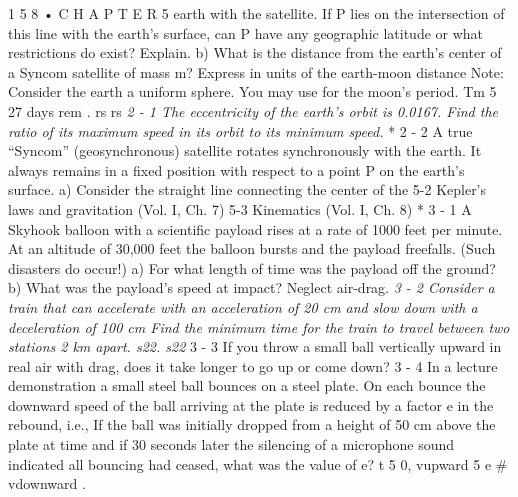 \documentclass[10pt,oneside]{article}
\begin{document}
1 5 8 • C H A P T E R  5 earth with the satellite. If P lies on the intersection of this line with the earth’s surface, can P have any geographic latitude or what restrictions do exist? Explain. b) What is the distance from the earth’s center of a Syncom satellite of mass m? Express in units of the earth-moon distance Note: Consider the earth a uniform sphere. You may use for the moon’s period. Tm 5 27 days rem . rs rs \emph{ 2 - 1 The eccentricity of the earth’s orbit is 0.0167. Find the ratio of its maximum speed in its orbit to its minimum speed. } * 2 - 2 A true “Syncom” (geosynchronous) satellite rotates synchronously with the earth. It always remains in a fixed position with respect to a point P on the earth’s surface. a) Consider the straight line connecting the center of the 5-2 Kepler’s laws and gravitation (Vol. I, Ch. 7) 5-3 Kinematics (Vol. I, Ch. 8) * 3 - 1 A Skyhook balloon with a scientific payload rises at a rate of 1000 feet per minute. At an altitude of 30,000 feet the balloon bursts and the payload freefalls. (Such disasters do occur!) a) For what length of time was the payload off the ground? b) What was the payload’s speed at impact? Neglect air-drag. \emph{ 3 - 2 Consider a train that can accelerate with an acceleration of 20 cm and slow down with a deceleration of 100 cm Find the minimum time for the train to travel between two stations 2 km apart. s22. s22 } 3 - 3 If you throw a small ball vertically upward in real air with drag, does it take longer to go up or come down? \emph{ } 3 - 4 In a lecture demonstration a small steel ball bounces on a steel plate. On each bounce the downward speed of the ball arriving at the plate is reduced by a factor e in the rebound, i.e., If the ball was initially dropped from a height of 50 cm above the plate at time and if 30 seconds later the silencing of a microphone sound indicated all bouncing had ceased, what was the value of e? t 5 0, vupward 5 e \# vdownward .\par
\end{document}

